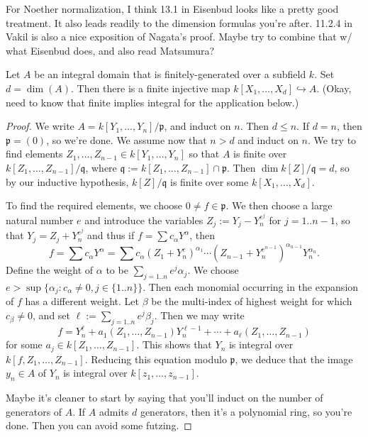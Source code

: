 \documentclass[10pt]{article}
\begin{document}
For Noether normalization, I think 13.1 in Eisenbud looks like a pretty good treatment.
It also leads readily to the dimension formulas you're after.
11.2.4 in Vakil is also a nice exposition of Nagata's proof.
Maybe try to combine that w/ what Eisenbud does, and also read Matsumura?


\begin{theorem}
  Let $A$ be an integral domain that is finitely-generated over
  a subfield $k$.  Set $d = \dim(A)$.  Then there is a finite
  injective map $k[X_1,\dotsc,X_d] \hookrightarrow A$.  (Okay,
  need to know that finite implies integral for the application
  below.)
\end{theorem}
\begin{proof}
  We write $A = k[Y_1,\dotsc,Y_n]/\mathfrak{p}$, and induct on
  $n$.  Then $d \leq n$.  If $d = n$, then $\mathfrak{p} = (0)$,
  so we're done.  We assume now that $n > d$ and induct on $n$.
  We try to find elements
  $Z_1, \dotsc, Z_{n-1} \in k[Y_1,\dotsc,Y_n]$ so that $A$ is
  finite over $k[Z_1,\dotsc,Z_{n-1}] / \mathfrak{q}$, where
  $\mathfrak{q} := k[Z_1,\dotsc,Z_{n-1}] \cap \mathfrak{p}$.
  Then $\dim k[Z]/\mathfrak{q} = d$,
  so by
  our inductive hypothesis,
  $k[Z]/\mathfrak{q}$
  is finite over some $k[X_1,\dotsc,X_d]$.

  To find the required elements,
  we choose $0 \neq f \in \mathfrak{p}$.
  We then choose a large natural number $e$
  and introduce the variables
  $Z_j := Y_j - Y_n^{e^j}$ for $j=1..n-1$,
  so that $Y_j = Z_j + Y_n^{e^j}$
  and thus if $f = \sum c_\alpha Y^\alpha$,
  then
  \[
    f = \sum c_\alpha Y^\alpha
    = \sum c_\alpha (Z_1 + Y_n^{e})^{\alpha_1}
    \dotsb (Z_{n-1} + Y_n^{e^{n-1}})^{\alpha_{n-1}}
    Y_n^{\alpha_n}.
  \]
  Define the weight of $\alpha$ to be
  $\sum_{j=1..n} e^j \alpha_j$.  We choose
  $e > \sup \{\alpha_j : c_\alpha \neq 0, j \in \{1..n\}\}$.
  Then each monomial occurring in the expansion of $f$ has a
  different weight.
  Let $\beta$ be the multi-index of highest weight
  for which $c_\beta \neq 0$,
  and set $\ell := \sum_{j=1..n} e^j \beta_j$.
  Then we may write
  \[
    f = Y_n^{\ell} + a_1(Z_1,\dotsc,Z_{n-1}) Y_n^{\ell-1} + \dotsb
    + a_\ell(Z_1,\dotsc,Z_{n-1})
  \]
  for some $a_j \in k[Z_1,\dotsc,Z_{n-1}]$.
  This shows that $Y_n$ is integral
  over $k[f,Z_1,\dotsc,Z_{n-1}]$.
  Reducing this equation modulo $\mathfrak{p}$,
  we deduce that the image $y_n \in A$
  of $Y_n$ is integral over $k[z_1,\dotsc,z_{n-1}]$.

  Maybe it's cleaner to start by saying that you'll induct on
  the number
  of generators of $A$.
  If $A$ admits $d$ generators,
  then it's a polynomial ring, so you're done.
  Then you can avoid some futzing.
\end{proof}
\end{document}
